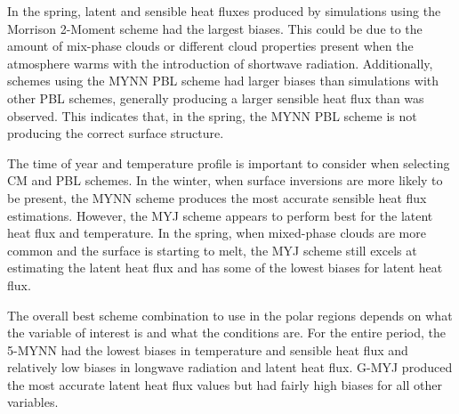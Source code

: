 In the spring, latent and sensible heat fluxes produced by simulations using the Morrison 2-Moment scheme had the largest biases. This could be due to the amount of mix-phase clouds or different cloud properties present when the atmosphere warms with the introduction of shortwave radiation. Additionally, schemes using the MYNN PBL scheme had larger biases than simulations with other PBL schemes, generally producing a larger sensible heat flux than was observed. This indicates that, in the spring, the MYNN PBL scheme is not producing the correct surface structure. 

The time of year and temperature profile is important to consider when selecting CM and PBL schemes. In the winter, when surface inversions are more likely to be present, the MYNN scheme produces the most accurate sensible heat flux estimations. However, the MYJ scheme appears to perform best for the latent heat flux and temperature. In the spring, when mixed-phase clouds are more common and the surface is starting to melt, the MYJ scheme still excels at estimating the latent heat flux and has some of the lowest biases for latent heat flux. 

The overall best scheme combination to use in the polar regions depends on what the variable of interest is and what the conditions are. For the entire period, the 5-MYNN had the lowest biases in temperature and sensible heat flux and relatively low biases in longwave radiation and latent heat flux. G-MYJ produced the most accurate latent heat flux values but had fairly high biases for all other variables. 